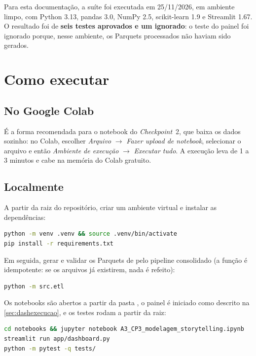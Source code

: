 Para esta documentação, a suíte foi executada em 25/11/2026, em ambiente limpo,
com Python 3.13, pandas 3.0, NumPy 2.5, scikit-learn 1.9 e Streamlit 1.67. O
resultado foi de \textbf{seis testes aprovados e um ignorado}: o teste do painel
foi ignorado porque, nesse ambiente, os Parquets processados não haviam sido
gerados.

\section{Como executar}\label{sec:comoexecutar}

\subsection{No Google Colab}\label{sec:colab}

É a forma recomendada para o notebook do \textit{Checkpoint}~2, que baixa os
dados sozinho: no Colab, escolher \textit{Arquivo} $\rightarrow$ \textit{Fazer
upload de notebook}, selecionar o arquivo  e então
\textit{Ambiente de execução} $\rightarrow$ \textit{Executar tudo}. A execução
leva de 1 a 3 minutos e cabe na memória do Colab gratuito.

\subsection{Localmente}\label{sec:local}

A partir da raiz do repositório, criar um ambiente virtual e instalar as
dependências:

\begin{lstlisting}[language=bash]
python -m venv .venv && source .venv/bin/activate
pip install -r requirements.txt
\end{lstlisting}

Em seguida, gerar e validar os Parquets de  pelo pipeline
consolidado (a função é idempotente: se os arquivos já existirem, nada é
refeito):

\begin{lstlisting}[language=bash]
python -m src.etl
\end{lstlisting}

Os notebooks são abertos a partir da pasta , o painel é iniciado
como descrito na \autoref{sec:dashexecucao}, e os testes rodam a partir da raiz:

\begin{lstlisting}[language=bash]
cd notebooks && jupyter notebook A3_CP3_modelagem_storytelling.ipynb
streamlit run app/dashboard.py
python -m pytest -q tests/
\end{lstlisting}

